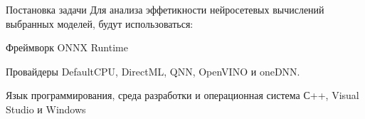 \documentclass[aspectratio=169,xcolor=dvipsnames]{beamer}
\begin{document}

\begin{frame}{Постановка задачи}
    Для анализа эффетикности нейросетевых вычислений выбранных моделей, будут использоваться:

    \begin{block}{Фреймворк}
        ONNX Runtime
    \end{block}

    \begin{block}{Провайдеры}
        DefaultCPU, DirectML, QNN, OpenVINO и oneDNN. 
    \end{block}

    \begin{block}{Язык программирования, среда разработки и операционная система}
        С++, Visual Studio и Windows
    \end{block}
\end{frame}


\end{document}
